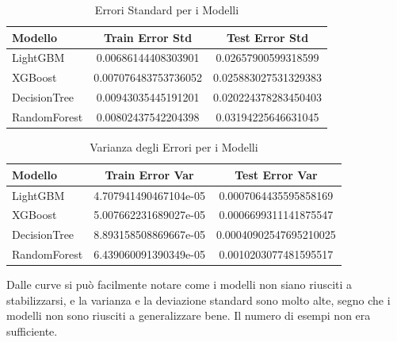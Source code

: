 \begin{table}[H]
    \centering
    \begin{tabular}{lcc}
    \toprule
    \textbf{Modello} & \textbf{Train Error Std} & \textbf{Test Error Std} \\
    \midrule
    LightGBM & 0.00686144408303901 & 0.02657900599318599 \\
    XGBoost & 0.007076483753736052 & 0.025883027531329383 \\
    DecisionTree & 0.00943035445191201 & 0.020224378283450403 \\
    RandomForest & 0.00802437542204398 & 0.03194225646631045 \\
    \bottomrule
    \end{tabular}
    \caption{Errori Standard per i Modelli}
    
\end{table}

\begin{table}[H]
    \centering
    \begin{tabular}{lcc}
    \toprule
    \textbf{Modello} & \textbf{Train Error Var} & \textbf{Test Error Var} \\
    \midrule
    LightGBM & 4.707941490467104e-05 & 0.0007064435595858169 \\
    XGBoost & 5.007662231689027e-05 & 0.0006699311141875547\\
    DecisionTree & 8.893158508869667e-05 & 0.00040902547695210025 \\
    RandomForest & 6.439060091390349e-05 & 0.0010203077481595517\\
    \bottomrule
    \end{tabular}
    \caption{Varianza degli Errori per i Modelli}
    
\end{table}

\noindent Dalle curve si può facilmente notare come i modelli non siano riusciti a stabilizzarsi, e la varianza e la deviazione standard sono molto alte, segno che i modelli non sono riusciti a generalizzare bene. Il numero di esempi non era sufficiente.

